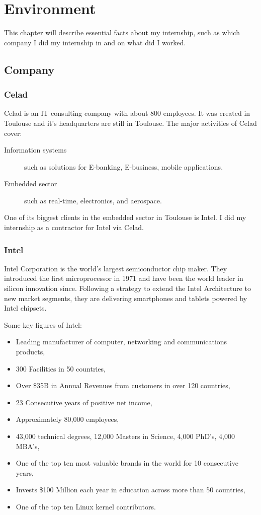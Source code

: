 \chapter{Environment}\label{chap:context}

\begin{sectionIntro}
    This chapter will describe essential facts about my internship, such as
    which company I did my internship in and on what did I worked.
\end{sectionIntro}

\section{Company}

\subsection{Celad}
Celad is an IT consulting company with about 800 employees. It was created in Toulouse
and it's headquarters are still in Toulouse.
The major activities of Celad cover:
\begin{description}
    \item [Information systems] such as solutions for E-banking, E-business, mobile applications.
    \item [Embedded sector] such as real-time, electronics, and aerospace.
\end{description}
One of its biggest clients in the embedded sector in Toulouse is Intel.
I did my internship as a contractor for Intel via Celad.

\subsection{Intel}
Intel Corporation is the world’s largest semiconductor chip maker. They
introduced the first microprocessor in 1971 and have been the world leader in
silicon innovation since.
Following a strategy to extend the Intel Architecture to new market segments,
they are delivering smartphones and tablets powered by Intel chipsets.

Some key figures of Intel:
\begin{itemize}
\item Leading manufacturer of computer, networking and communications
  products,
  \item 300 Facilities in 50 countries,
  \item Over \$35B in Annual Revenues from customers in over 120
    countries,
\item 23 Consecutive years of positive net income,
\item Approximately 80,000 employees,
\item 43,000 technical degrees, 12,000 Masters in Science, 4,000
  PhD’s, 4,000 MBA’s,
  \item One of the top ten most valuable brands in the world for 10
    consecutive years,
\item Invests \$100 Million each year in education across more than 50
  countries,
\item One of the top ten Linux \gls{kernel} contributors.
\end{itemize}


